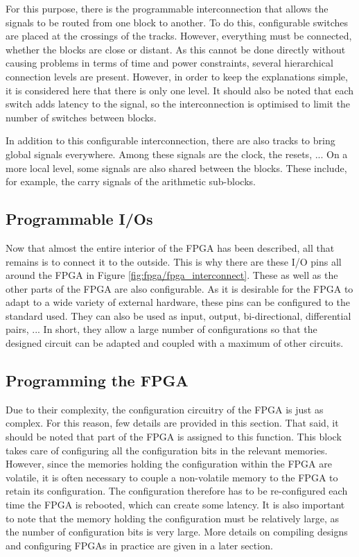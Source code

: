 For this purpose, there is the programmable interconnection that allows the signals to be routed 
from one block to another. To do this, configurable switches are placed at the crossings of the 
tracks. However, everything must be connected, whether the blocks are close or distant. As this 
cannot be done directly without causing problems in terms of time and power constraints, several 
hierarchical connection levels are present. However, in order to keep the explanations simple, it 
is considered here that there is only one level. It should also be noted that each switch adds 
latency to the signal, so the interconnection is optimised to limit the number of switches between 
blocks. 

In addition to this configurable interconnection, there are also tracks to bring global signals 
everywhere. Among these signals are the clock, the resets, ... On a more local level, some signals 
are also shared between the blocks. These include, for example, the carry signals of the arithmetic 
sub-blocks.

\subsection{Programmable I/Os}

Now that almost the entire interior of the FPGA has been described, all that remains is to connect 
it to the outside. This is why there are these I/O pins all around the FPGA in Figure 
\ref{fig:fpga/fpga_interconnect}. These as well as the other parts of the FPGA are also 
configurable. As it is desirable for the FPGA to adapt to a wide variety of external hardware, these 
pins can be configured to the standard used. They can also be used as input, output, bi-directional, 
differential pairs, ... In short, they allow a large number of configurations so that the designed 
circuit can be adapted and coupled with a maximum of other circuits.

\subsection{Programming the FPGA}


Due to their complexity, the configuration circuitry of the FPGA is just as complex. For this 
reason, few details are provided in this section. That said, it should be noted that part of 
the FPGA is assigned to this function. This block takes care of configuring all the 
configuration bits in the relevant memories. However, since the memories holding the configuration 
within the FPGA are volatile, it is often necessary to couple a non-volatile memory to the 
FPGA to retain its configuration. The configuration therefore has to be re-configured each 
time the FPGA is rebooted, which can create some latency. It is also important to note that the 
memory holding the configuration must be relatively large, as the number of configuration bits is 
very large. More details on compiling designs and configuring FPGAs in practice are given in a 
later section.

